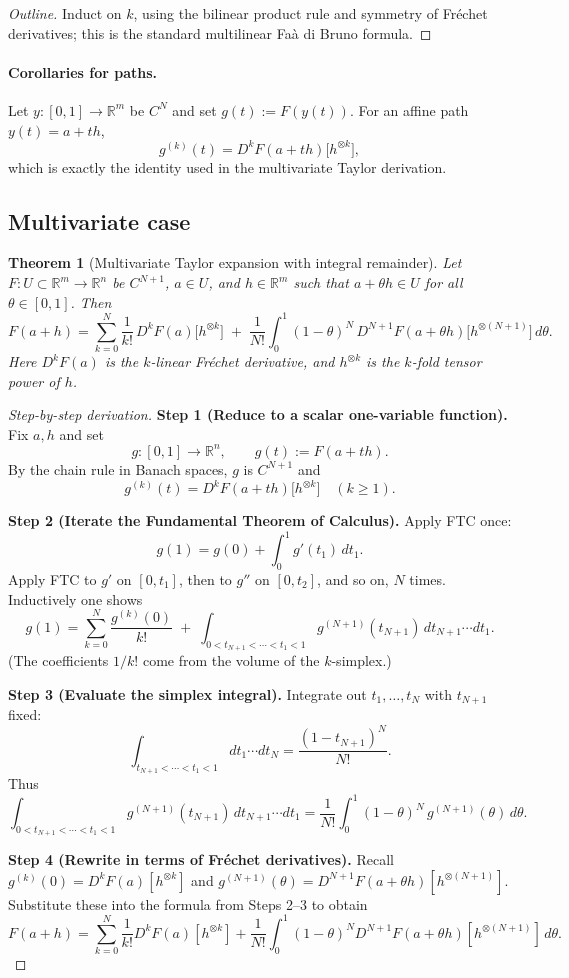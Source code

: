 \documentclass[12pt]{article}
\newtheorem{theorem}{Theorem}[section]
\theoremstyle{remark}
\begin{document}
\begin{proof}[Outline]
Induct on $k$, using the bilinear product rule and symmetry of Fr\'echet derivatives; this is the standard multilinear Fa\`a di Bruno formula.
\end{proof}

\paragraph{Corollaries for paths.}
Let $y:[0,1]\to\mathbb{R}^m$ be $C^{N}$ and set $g(t):=F(y(t))$.
For an affine path $y(t)=a+th$,
\[
g^{(k)}(t)=D^{k}F(a+th)\big[h^{\otimes k}\big],
\]
which is exactly the identity used in the multivariate Taylor derivation.

\subsection{Multivariate case}

\begin{theorem}[Multivariate Taylor expansion with integral remainder]
Let $F:U\subset\mathbb{R}^m\to\mathbb{R}^n$ be $C^{N+1}$, $a\in U$, and $h\in\mathbb{R}^m$
such that $a+\theta h\in U$ for all $\theta\in[0,1]$. Then
\[
F(a+h)
= \sum_{k=0}^{N} \frac{1}{k!}\,D^kF(a)\big[h^{\otimes k}\big]
 \;+\; \frac{1}{N!}\int_0^1 (1-\theta)^N\,D^{N+1}F(a+\theta h)\big[h^{\otimes(N+1)}\big]\,d\theta.
\]
Here $D^kF(a)$ is the $k$-linear Fr\'echet derivative, and $h^{\otimes k}$ is the $k$-fold tensor power of $h$.
\end{theorem}

\begin{proof}[Step-by-step derivation]
\textbf{Step 1 (Reduce to a scalar one-variable function).}
Fix $a,h$ and set
\[
g:[0,1]\to\mathbb{R}^n,\qquad g(t):=F(a+th).
\]
By the chain rule in Banach spaces, $g$ is $C^{N+1}$ and
\[
g^{(k)}(t)=D^kF(a+th)\big[h^{\otimes k}\big]\quad (k\ge 1).
\]

\medskip
\textbf{Step 2 (Iterate the Fundamental Theorem of Calculus).}
Apply FTC once:
\[
g(1)=g(0)+\int_0^1 g'(t_1)\,dt_1.
\]
Apply FTC to $g'$ on $[0,t_1]$, then to $g''$ on $[0,t_2]$, and so on, $N$ times. Inductively one shows
\[
g(1)
= \sum_{k=0}^{N}\frac{g^{(k)}(0)}{k!}
 \;+\; \int_{0<t_{N+1}<\cdots<t_1<1} g^{(N+1)}(t_{N+1})\,dt_{N+1}\cdots dt_1.
\]
(The coefficients $1/k!$ come from the volume of the $k$-simplex.)

\medskip
\textbf{Step 3 (Evaluate the simplex integral).}
Integrate out $t_1,\dots,t_N$ with $t_{N+1}$ fixed:
\[
\int_{t_{N+1}<\cdots<t_1<1} dt_1\cdots dt_N
= \frac{(1-t_{N+1})^N}{N!}.
\]
Thus
\[
\int_{0<t_{N+1}<\cdots<t_1<1} g^{(N+1)}(t_{N+1})\,dt_{N+1}\cdots dt_1
= \frac{1}{N!}\int_0^1 (1-\theta)^N\,g^{(N+1)}(\theta)\,d\theta.
\]

\medskip
\textbf{Step 4 (Rewrite in terms of Fr\'echet derivatives).}
Recall $g^{(k)}(0)=D^kF(a)[h^{\otimes k}]$ and
$g^{(N+1)}(\theta)=D^{N+1}F(a+\theta h)[h^{\otimes (N+1)}]$.
Substitute these into the formula from Steps 2–3 to obtain
\[
F(a+h)=\sum_{k=0}^{N}\frac{1}{k!}D^kF(a)[h^{\otimes k}]
+\frac{1}{N!}\int_0^1 (1-\theta)^N D^{N+1}F(a+\theta h)[h^{\otimes (N+1)}]\,d\theta.
\]
\end{proof}
\end{document}
